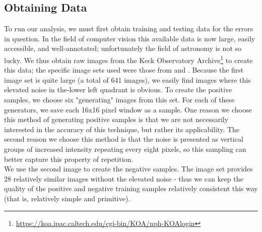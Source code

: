 \documentclass[twocolumn,longauthor]{aastex61}
\begin{document}
\subsection{Obtaining Data} \label{subsec:data}
\noindent To run our analysis, we must first obtain training and testing data for the errors in question. In the field of computer vision this available data is now large, easily accessible, and well-annotated; unfortunately the field of astronomy is not so lucky. We thus obtain raw images from the Keck Observatory Archive\footnote{\url{https://koa.ipac.caltech.edu/cgi-bin/KOA/nph-KOAlogin}} to create this data; the specific image sets used were those from \citet{2006ApJ..649..306} and \cite{2016ApJ..827..16}.\newpage
\indent Because the first image set is quite large (a total of 641 images), we easily find images where this elevated noise in the-lower left quadrant is obvious. To create the positive samples, we choose six "generating" images from this set. For each of these generators, we save each 16x16 pixel window as a sample. One reason we choose this method of generating positive samples is that we are not necessarily interested in the accuracy of this technique, but rather its applicability. The second reason we choose this method is that the noise is presented as vertical groups of increased intensity repeating every eight pixels, so this sampling can better capture this property of repetition.\\
\indent We use the second image to create the negative samples. The image set provides 28 relatively similar images without the elevated noise - thus we can keep the quality of the positive and negative training samples relatively consistent this way (that is, relatively simple and primitive). 
\end{document}
